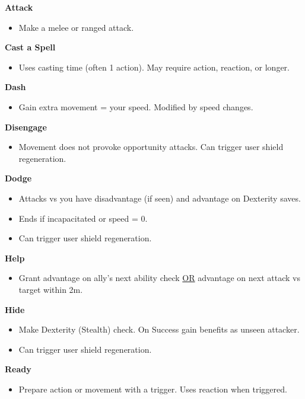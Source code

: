 \begin{scifitablebox}[screenbox,title=\textcolor{PanelGlow}{Combat Actions}]
\textbf{Attack}
\begin{itemize}
\item Make a melee or ranged attack.
\end{itemize}

\textbf{Cast a Spell}
\begin{itemize}
\item Uses casting time (often 1 action). May require action, reaction, or longer.
\end{itemize}

\textbf{Dash}
\begin{itemize}
\item Gain extra movement = your speed. Modified by speed changes.
\end{itemize}

\textbf{Disengage}
\begin{itemize}
\item Movement does not provoke opportunity attacks. Can trigger user shield regeneration.
\end{itemize}

\textbf{Dodge}
\begin{itemize}
\item Attacks vs you have disadvantage (if seen) and advantage on Dexterity saves.
\item Ends if incapacitated or speed = 0.
\item Can trigger user shield regeneration.
\end{itemize}

\textbf{Help}
\begin{itemize}
\item Grant advantage on ally's next ability check \underline{OR} advantage on next attack vs target within 2m.
\end{itemize}

\textbf{Hide}
\begin{itemize}
\item Make Dexterity (Stealth) check. On Success gain benefits as unseen attacker.
\item Can trigger user shield regeneration.
\end{itemize}

\textbf{Ready}
\begin{itemize}
\item Prepare action or movement with a trigger. Uses reaction when triggered.
\end{itemize}


\end{scifitablebox}

